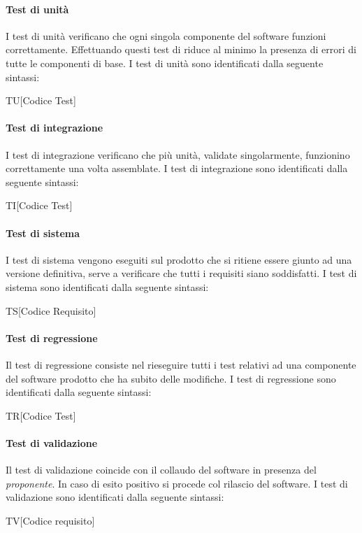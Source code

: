 \paragraph{Test di unità}
I test di unità verificano che ogni singola componente del software funzioni
correttamente. Effettuando questi test di riduce al minimo la presenza di errori
di tutte le componenti di base. I test di unità sono identificati dalla seguente
sintassi:
\begin{center}
  TU[Codice Test]
\end{center}
\paragraph{Test di integrazione}
I test di integrazione verificano che più unità, validate singolarmente, funzionino
correttamente una volta assemblate. I test di integrazione sono identificati
dalla seguente sintassi:
\begin{center}
  TI[Codice Test]
\end{center}
\paragraph{Test di sistema}
I test di sistema vengono eseguiti sul prodotto che si ritiene essere giunto ad
una versione definitiva, serve a verificare che tutti i requisiti siano
soddisfatti. I test di sistema sono identificati dalla seguente sintassi:
\begin{center}
  TS[Codice Requisito]
\end{center}
\paragraph{Test di regressione}
Il test di regressione consiste nel rieseguire tutti i test relativi ad una
componente del software prodotto che ha subito delle modifiche. I test di
regressione sono identificati dalla seguente sintassi:
\begin{center}
  TR[Codice Test]
\end{center}
\paragraph{Test di validazione}
Il test di validazione coincide con il collaudo del software in presenza del
\textit{proponente}. In caso di esito positivo si procede col rilascio del
software. I test di validazione sono identificati dalla seguente sintassi:
\begin{center}
  TV[Codice requisito]
\end{center}


